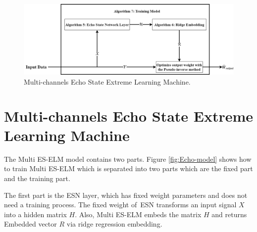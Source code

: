 \begin{figure}[ht]
    \centering
    \includegraphics[width=\textwidth]{img/Algorithm2.png}
    \caption{Multi-channels Echo State Extreme
Learning Machine.}
    \label{fig:Algorithm}
\end{figure}


\section{Multi-channels Echo State Extreme Learning Machine}\label{subsec:multi model}


The Multi ES-ELM model contains two parts. Figure \ref{fig:Echo-model} shows how to train Multi ES-ELM which is separated into two parts which are the fixed part and the training part. 

The first part is the ESN layer, which has fixed weight parameters and does not need a training process. The fixed weight of~ESN transforms an input signal $X$ into a hidden matrix $H$. Also, Multi ES-ELM embeds the matrix $H$ and returns Embedded vector $R$ via ridge regression embedding. 

